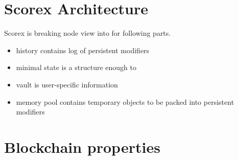 
\section{Scorex Architecture}

Scorex is breaking node view into for following parts. 

\begin{itemize}
\item{history} contains log of persistent modifiers
\item{minimal state} is a structure enough to 
\item{vault} is user-specific information
\item{memory pool} contains temporary objects to be packed into persistent modifiers 
\end{itemize}

\section{Blockchain properties}

